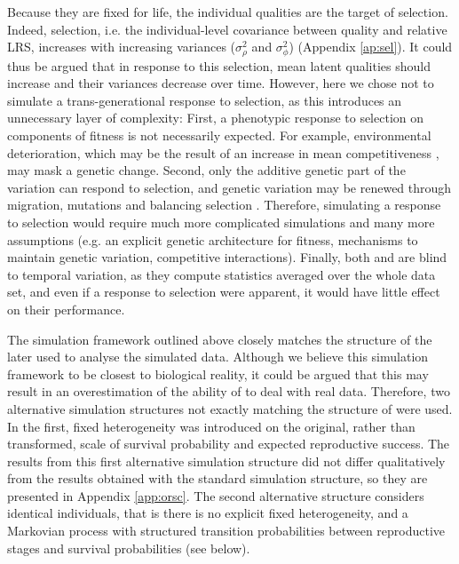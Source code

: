 Because they are fixed for life, the individual qualities are the target of selection. Indeed, selection, i.e. the individual-level covariance between quality and relative LRS, increases with increasing variances ($\sigma_{\rho}^2$ and $\sigma_{\phi}^2$) (Appendix \ref{ap:sel}). It could thus be argued that in response to this selection, mean latent qualities should increase and their variances decrease over time. However, here we chose not to simulate a trans-generational response to selection, as this introduces an unnecessary layer of complexity: First, a phenotypic response to selection on components of fitness is not necessarily expected. For example, environmental deterioration, which may be the result of an increase in mean competitiveness \parencite{Fisher1958,Hadfield2011}, may mask a genetic change. Second, only the additive genetic part of the variation can respond to selection, and genetic variation may be renewed through migration, mutations and balancing selection \parencite{Fisher1958,Charlesworth2014}.
Therefore, simulating a response to selection would require much more complicated simulations and many more assumptions (e.g. an explicit genetic architecture for fitness, mechanisms to maintain genetic variation, competitive interactions). 
Finally, both \MM and \NSM are blind to temporal variation, as they compute statistics averaged over the whole data set, and even if a response to selection were apparent, it would have little effect on their performance.

The simulation framework outlined above closely matches the structure of the \MM later used to analyse the simulated data. Although we believe this simulation framework to be closest to biological reality, it could be argued that this may result in an overestimation of the ability of \MM to deal with real data. Therefore, two alternative simulation structures not exactly matching the structure of \MM were used. In the first, fixed heterogeneity was introduced on the original, rather than transformed, scale of survival probability and expected reproductive success. The results from this first alternative simulation structure did not differ qualitatively from the results obtained with the standard simulation structure, so they are presented in Appendix \ref{app:orsc}. The second alternative structure considers identical individuals, that is there is no explicit fixed heterogeneity, and a Markovian process with structured transition probabilities between reproductive stages and survival probabilities (see below).

